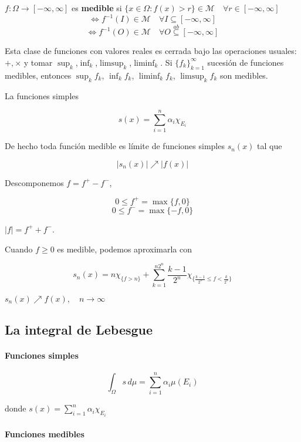 \begin{fdefinition}
    $f:\Omega\to [-\infty,\infty]$ es \textbf{medible} si $\{x\in \Omega:f(x)>r\}\in\mathcal{M}\quad \forall r\in[-\infty,\infty]$
    \[\iff f^{-1}(I)\in \mathcal{M}\quad\forall I\subseteq [-\infty,\infty]\]
    \[\iff f^{-1}(O)\in\mathcal{M}\quad\forall O\overset{ab}{\subseteq}[-\infty,\infty]\]
\end{fdefinition}

Esta clase de funciones con valores reales es cerrada bajo las operaciones usuales: $+,\times$ y tomar $\sup_k$,$\inf_k$,$\limsup_k$,$\liminf_k$. Si $\{f_k\}_{k=1}^\infty$ sucesión de funciones medibles, entonces $\sup_k f_k$, $\inf_k f_k$, $\liminf_k f_k$, $\limsup_k f_k$ son medibles.

\begin{fexample}
    La funciones simples 

    \[s(x)=\sum_{i=1}^n\alpha_i\chi_{E_i}\]

    De hecho toda función medible es límite de funciones simples $s_n(x)$ tal que 

    \[|s_n(x)|\nearrow|f(x)|\]

    Descomponemos $f=f^+-f^-$,

    \[0\leq f^+=\max\{f,0\}\]
    \[0\leq f^-=\max\{-f,0\}\]

    $|f|=f^+ + f^-$.

    Cuando $f\geq 0$ es medible, podemos aproximarla con 

    \[s_n(x)=n\chi_{\{f>n\}}+\sum_{k=1}^{n2^n}\frac{k-1}{2^n}\chi_{\{\frac{k-1}{2^n}\leq f<\frac{k}{2^n}\}}\]

    $s_n(x)\nearrow f(x),\quad n\to\infty$
\end{fexample}

\subsection{La integral de Lebesgue}

\paragraph{Funciones simples}

\[\int_\Omega s\,d\mu=\sum_{i=1}^n \alpha_i \mu(E_i)\]

donde $s(x)=\sum_{i=1}^n \alpha_i\chi_{E_i}$

\paragraph{Funciones medibles}

